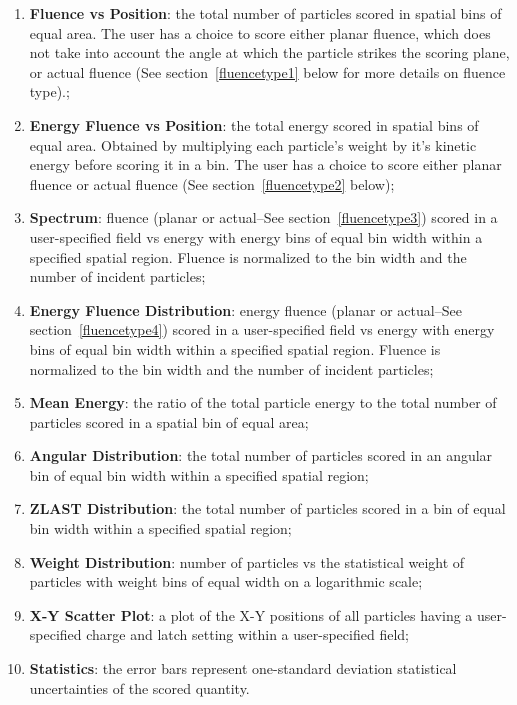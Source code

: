 \documentclass[12pt,twoside]{article}
\begin{document}
\begin{enumerate}
\item {\bf Fluence vs Position}: the total number of particles scored in
spatial bins of equal area. The user has a choice to score either planar
fluence, which does not take into account the angle at which the particle
strikes the scoring plane, or actual fluence (See section~\ref{fluencetype1}
below for more details on fluence type).;

\item {\bf Energy Fluence vs Position}: the total energy scored in spatial
bins of equal area.  Obtained by multiplying each particle's weight by it's
kinetic energy before scoring it in a bin. The user has a choice to score
either planar fluence or actual fluence (See section~\ref{fluencetype2} below);

\item {\bf Spectrum}: fluence (planar or actual--See section~\ref{fluencetype3})
scored in a user-specified
field vs energy with energy bins
of equal bin width within a specified spatial region.  Fluence is
normalized to the bin width and the number of incident particles;

\item {\bf Energy Fluence Distribution}: energy fluence
(planar or actual--See section~\ref{fluencetype4})
scored in a user-specified field vs
energy with energy bins
of equal bin width within a specified spatial region.  Fluence is
normalized to the bin width and the number of incident particles;


\item {\bf Mean Energy}: the ratio of the total particle energy to the
total number of particles scored in a spatial bin of equal area;

\item {\bf Angular Distribution}: the total number of particles scored in
an angular bin of equal bin width within a specified spatial region;

\item {\bf ZLAST Distribution}: the total number of particles scored in a
bin of equal bin width within a specified spatial region;

\item {\bf Weight Distribution}: number of particles vs the statistical
weight of particles with weight bins of equal width on a logarithmic
scale;

\item {\bf X-Y Scatter Plot}: a plot of the X-Y positions of all particles
having a user-specified charge and latch setting within a user-specified
field;

\item {\bf Statistics}: the error bars represent one-standard deviation
statistical uncertainties of the scored quantity.

\end{enumerate}
\end{document}
